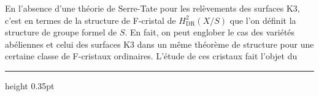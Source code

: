 \documentclass[9pt]{article}
\newcommand{\CanonText}[1]{\par{\fontsize{8.0}{9.35}\selectfont\RaggedRight #1\par}\vspace{2.2pt}}
\begin{document}
\begin{minipage}[t][\dimexpr\textheight-5pt\relax][t]{\textwidth}
\CanonText{En l'absence d'une théorie de Serre-Tate pour les relèvements des surfaces K3, c'est en termes de la structure de F-cristal de \(H^{2}_{\mathrm{DR}}(X/S)\) que l'on définit la structure de groupe formel de \(S\). En fait, on peut englober le cas des variétés abéliennes et celui des surfaces K3 dans un même théorème de structure pour une certaine classe de F-cristaux ordinaires. L'étude de ces cristaux fait l'objet du}
\vfill
{\color{Accent}\hrule height 0.35pt}\vspace{3pt}
\end{minipage}
\newpage
\end{document}
